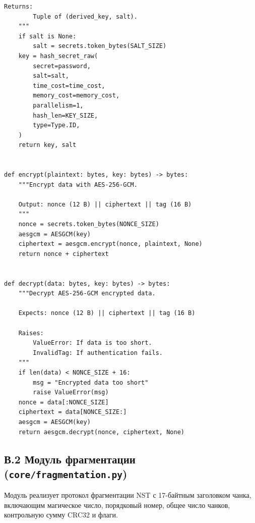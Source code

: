 \begin{lstlisting}[style=appendixcode]
    Returns:
        Tuple of (derived_key, salt).
    """
    if salt is None:
        salt = secrets.token_bytes(SALT_SIZE)
    key = hash_secret_raw(
        secret=password,
        salt=salt,
        time_cost=time_cost,
        memory_cost=memory_cost,
        parallelism=1,
        hash_len=KEY_SIZE,
        type=Type.ID,
    )
    return key, salt


def encrypt(plaintext: bytes, key: bytes) -> bytes:
    """Encrypt data with AES-256-GCM.

    Output: nonce (12 B) || ciphertext || tag (16 B)
    """
    nonce = secrets.token_bytes(NONCE_SIZE)
    aesgcm = AESGCM(key)
    ciphertext = aesgcm.encrypt(nonce, plaintext, None)
    return nonce + ciphertext


def decrypt(data: bytes, key: bytes) -> bytes:
    """Decrypt AES-256-GCM encrypted data.

    Expects: nonce (12 B) || ciphertext || tag (16 B)

    Raises:
        ValueError: If data is too short.
        InvalidTag: If authentication fails.
    """
    if len(data) < NONCE_SIZE + 16:
        msg = "Encrypted data too short"
        raise ValueError(msg)
    nonce = data[:NONCE_SIZE]
    ciphertext = data[NONCE_SIZE:]
    aesgcm = AESGCM(key)
    return aesgcm.decrypt(nonce, ciphertext, None)
\end{lstlisting}

\newpage
\subsection*{В.2 Модуль фрагментации (\texttt{core/fragmentation.py})}

Модуль реализует протокол фрагментации NST с 17-байтным заголовком чанка,
включающим магическое число, порядковый номер, общее число чанков,
контрольную сумму CRC32 и флаги.

